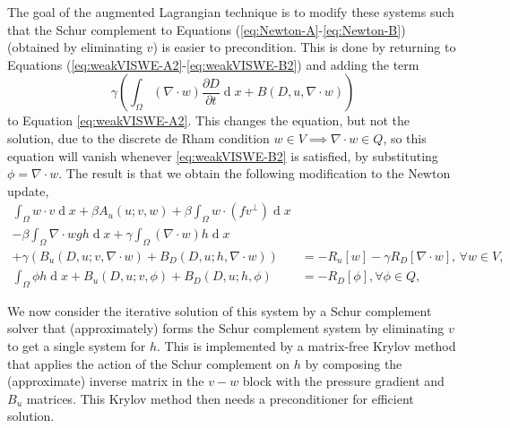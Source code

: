 \documentclass[pdflatex,sn-mathphys]{sn-jnl}%
\theoremstyle{thmstyleone}%
\theoremstyle{thmstyletwo}%
\theoremstyle{thmstylethree}%
\newcommand{\pp}[2]{\frac{\partial #1}{\partial #2}}
\DeclareMathOperator{\diff}{d}
\begin{document}
The goal of the augmented Lagrangian technique is to modify these
systems such that the Schur complement to Equations
(\ref{eq:Newton-A}-\ref{eq:Newton-B}) (obtained by eliminating $v$) is
easier to precondition. This is done by returning to Equations 
(\ref{eq:weakVISWE-A2}-\ref{eq:weakVISWE-B2}) and adding the term
\begin{equation}
  \gamma \left(
  \int_{\Omega}(\nabla\cdot w)\pp{D}{t}\diff x
  + B(D,u,\nabla\cdot w)  \right)
\end{equation}
to Equation \eqref{eq:weakVISWE-A2}. This changes the equation, but
not the solution, due to the discrete de Rham condition $w\in
V\implies \nabla\cdot w\in Q$, so this equation will vanish whenever
\eqref{eq:weakVISWE-B2} is satisfied, by substituting
$\phi=\nabla\cdot w$. The result is that we obtain the following
modification to the Newton update,
\begin{align}
  \int_{\Omega}{w}\cdot v\diff x
  + \beta A_u(u;v,w)
    + \beta \int_\Omega{w}\cdot (f{v}^\perp) \diff x
\nonumber\\
- \beta \int_{\Omega}\nabla\cdot{w} gh \diff x
+  \gamma\int_{\Omega}(\nabla\cdot w) h\diff x \nonumber \\
  + \gamma\left(B_u(D,u;v,\nabla\cdot w)
  + B_D(D,u;h,\nabla\cdot w)\right)
&=-R_u[w] - \gamma R_D[\nabla\cdot w],\, \forall w\in V, \label{eq:NewtonAL-v}\\
  \int_{\Omega}\phi h\diff x
  + B_u(D,u;v,\phi)
  + B_D(D,u;h,\phi)
  &= -R_D[\phi],\label{eq:NewtonAL-h} \forall \phi \in Q,
\end{align}

We now consider the iterative solution of this system by
a Schur complement solver that (approximately) forms
the Schur complement system by eliminating $v$ to get a
single system for $h$. This is implemented by a matrix-free
Krylov method that applies the action of the Schur complement
on $h$ by composing the (approximate) inverse matrix in
the $v-w$ block with the pressure gradient and $B_u$ matrices.
This Krylov method then needs a preconditioner for efficient
solution.
\end{document}
